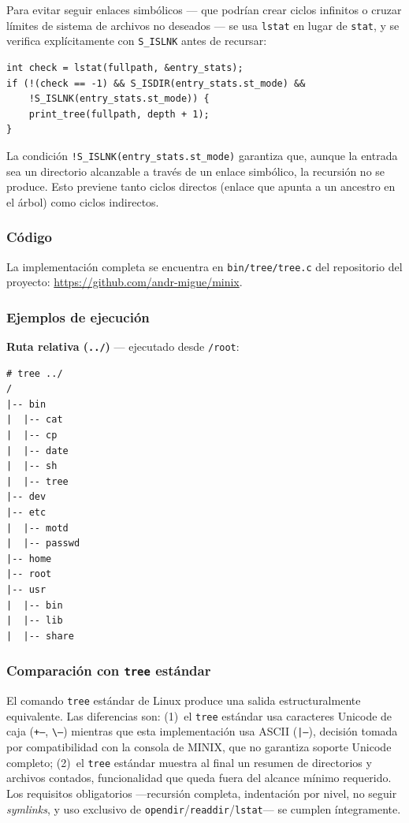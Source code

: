\documentclass[11pt,a4paper]{article}
\begin{document}
Para evitar seguir enlaces simb\'olicos --- que podr\'ian crear ciclos infinitos o cruzar l\'imites de sistema de archivos no deseados --- se usa \texttt{lstat} en lugar de \texttt{stat}, y se verifica expl\'icitamente con \texttt{S\_ISLNK} antes de recursar:

\begin{lstlisting}[style=cstyle,caption={Prevenci\'on de ciclos mediante \texttt{lstat} y \texttt{S\_ISLNK}}]
int check = lstat(fullpath, &entry_stats);
if (!(check == -1) && S_ISDIR(entry_stats.st_mode) &&
    !S_ISLNK(entry_stats.st_mode)) {
    print_tree(fullpath, depth + 1);
}
\end{lstlisting}

La condici\'on \texttt{!S\_ISLNK(entry\_stats.st\_mode)} garantiza que, aunque la entrada sea un directorio alcanzable a trav\'es de un enlace simb\'olico, la recursi\'on no se produce. Esto previene tanto ciclos directos (enlace que apunta a un ancestro en el \'arbol) como ciclos indirectos.

\subsubsection*{C\'odigo}

La implementaci\'on completa se encuentra en \texttt{bin/tree/tree.c} del repositorio del proyecto: \url{https://github.com/andr-migue/minix}.

\subsubsection*{Ejemplos de ejecuci\'on}

\textbf{Ruta relativa (\texttt{../})} --- ejecutado desde \texttt{/root}:
\begin{lstlisting}[style=bashstyle]
# tree ../
/
|-- bin
|  |-- cat
|  |-- cp
|  |-- date
|  |-- sh
|  |-- tree
|-- dev
|-- etc
|  |-- motd
|  |-- passwd
|-- home
|-- root
|-- usr
|  |-- bin
|  |-- lib
|  |-- share
\end{lstlisting}

\subsubsection*{Comparaci\'on con \texttt{tree} est\'andar}

El comando \texttt{tree} est\'andar de Linux produce una salida estructuralmente equivalente. Las diferencias son: (1)~el \texttt{tree} est\'andar usa caracteres Unicode de caja (\texttt{+--}, \texttt{\textbackslash{}--}) mientras que esta implementaci\'on usa ASCII (\texttt{|--}), decisi\'on tomada por compatibilidad con la consola de MINIX, que no garantiza soporte Unicode completo; (2)~el \texttt{tree} est\'andar muestra al final un resumen de directorios y archivos contados, funcionalidad que queda fuera del alcance m\'inimo requerido. Los requisitos obligatorios ---recursi\'on completa, indentaci\'on por nivel, no seguir \emph{symlinks}, y uso exclusivo de \texttt{opendir}/\texttt{readdir}/\texttt{lstat}--- se cumplen \'integramente.
\end{document}

